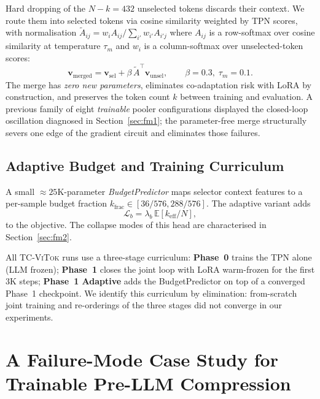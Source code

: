 \documentclass[runningheads]{llncs}
\newcommand{\vsel}{\mathbf{v}_{\mathrm{sel}}}
\newcommand{\vunsel}{\mathbf{v}_{\mathrm{unsel}}}
\newcommand{\vmerged}{\mathbf{v}_{\mathrm{merged}}}
\newcommand{\keff}{k_{\mathrm{eff}}}
\newcommand{\lbb}{\lambda_b}
\begin{document}
Hard dropping of the $N{-}k{=}432$ unselected tokens discards their
context. We route them into selected tokens via cosine similarity
weighted by TPN scores, with normalisation
$\tilde{A}_{ij}{=}w_i A_{ij}/\sum_{i'} w_{i'} A_{i'j}$ where
$A_{ij}$ is a row-softmax over cosine similarity at temperature
$\tau_m$ and $w_i$ is a column-softmax over unselected-token scores:
\begin{equation}
\vmerged = \vsel + \beta\,\tilde{A}^\top \vunsel, \qquad \beta{=}0.3,\; \tau_m{=}0.1.
\end{equation}
The merge has \emph{zero new parameters}, eliminates co-adaptation
risk with LoRA by construction, and preserves the token count $k$
between training and evaluation. A previous family of eight
\emph{trainable} pooler configurations displayed the closed-loop
oscillation diagnosed in Section~\ref{sec:fm1}; the parameter-free
merge structurally severs one edge of the gradient circuit and
eliminates those failures.

\subsection{Adaptive Budget and Training Curriculum}
\label{sec:training}

A small ${\approx}25$K-parameter \emph{BudgetPredictor} maps selector
context features to a per-sample budget fraction
$k_\mathrm{frac}\!\in\![36/576, 288/576]$. The adaptive variant adds
\begin{equation}
\mathcal{L}_b = \lbb\,\mathbb{E}[\keff/N],
\label{eq:budget-loss}
\end{equation}
to the objective. The collapse modes of this head are characterised in
Section~\ref{sec:fm2}.

All \textsc{TC-ViTok} runs use a three-stage curriculum: \textbf{Phase~0}
trains the TPN alone (LLM frozen); \textbf{Phase~1} closes the joint loop
with LoRA warm-frozen for the first 3K steps; \textbf{Phase~1 Adaptive}
adds the BudgetPredictor on top of a converged Phase~1 checkpoint. We
identify this curriculum by elimination: from-scratch joint training and
re-orderings of the three stages did not converge in our experiments.

\section{A Failure-Mode Case Study for Trainable Pre-LLM Compression}
\label{sec:taxonomy}
\end{document}
